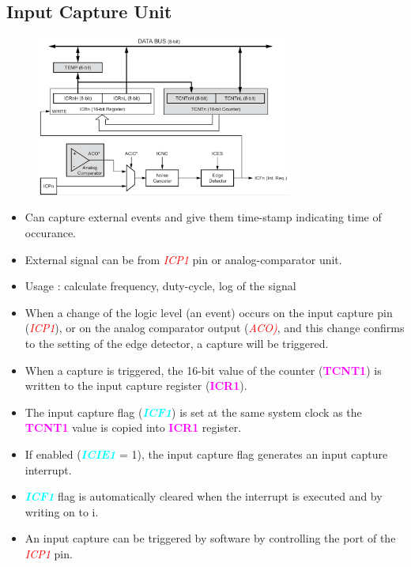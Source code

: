 \documentclass{article}
\newcommand{\bitFormat}[1]{\emph{\textbf{\textcolor{cyan}{#1}}}}
\newcommand{\regFormat}[1]{\textbf{\textcolor{magenta}{#1}}}
\newcommand{\pinFormat}[1]{\emph{\textcolor{red}{#1}}}
\begin{document}
\subsection{Input Capture Unit}
\begin{figure}[H]
    \centering
    \includegraphics[width=0.75\textwidth]{Timer1InputCapture.png}
\end{figure}
\begin{itemize}
    \item Can capture external events and give them time-stamp indicating time of occurance.
    \item External signal can be from \pinFormat{ICP1} pin or analog-comparator unit.
    \item Usage : calculate frequency, duty-cycle, log of the signal
    \item When a change of the logic level (an event) occurs on the input capture pin (\pinFormat{ICP1}), or on the analog comparator output (\pinFormat{ACO)}, and this change confirms to the setting of the edge detector, a capture will be triggered. 
    \item When a capture is triggered, the 16-bit value of the counter (\regFormat{TCNT1}) is written to the input capture register (\regFormat{ICR1}).
    \item The input capture flag (\bitFormat{ICF1}) is set at the same system clock as the \regFormat{TCNT1} value is copied into \regFormat{ICR1} register. 
    \item If enabled (\bitFormat{ICIE1} = 1), the input capture flag generates an input capture interrupt.
    \item \bitFormat{ICF1} flag is automatically cleared when the interrupt is executed and by writing on to i.
    \item An input capture can be triggered by software by controlling the port of the \pinFormat{ICP1} pin.
\end{itemize}
\end{document}
